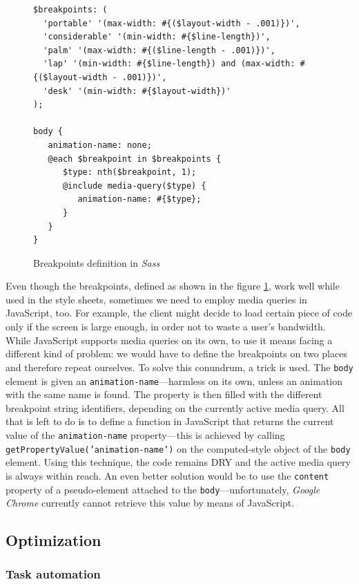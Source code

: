 \documentclass[thesis=M,english,hidelinks]{FITthesis}[2012/10/20]
\newcommand{\code}{\texttt}
\begin{document}
\begin{figure}[h]
  \begin{lstlisting}
$breakpoints: (
  'portable' '(max-width: #{($layout-width - .001)})',
  'considerable' '(min-width: #{$line-length})',
  'palm' '(max-width: #{($line-length - .001)})',
  'lap' '(min-width: #{$line-length}) and (max-width: #{($layout-width - .001)})',
  'desk' '(min-width: #{$layout-width})'
);

body {
   animation-name: none;
   @each $breakpoint in $breakpoints {
      $type: nth($breakpoint, 1);
      @include media-query($type) {
         animation-name: #{$type};
      }
   }
}
  \end{lstlisting}
  \caption{Breakpoints definition in \textit{Sass}}
  \label{fig:sass_breakpoints}
\end{figure}

Even though the breakpoints, defined as shown in the figure \ref{fig:sass_breakpoints}, work well while used in the style sheets, sometimes we need to employ media queries in JavaScript, too. For example, the client might decide to load certain piece of code only if the screen is large enough, in order not to waste a user's bandwidth. While JavaScript supports media queries on its own, to use it means facing a different kind of problem: we would have to define the breakpoints on two places and therefore repeat ourselves. To solve this conundrum, a trick is used. The \code{body} element is given an \code{animation-name}---harmless on its own, unless an animation with the same name is found. The property is then filled with the different breakpoint string identifiers, depending on the currently active media query. All that is left to do is to define a function in JavaScript that returns the current value of the \code{animation-name} property---this is achieved by calling \code{getPropertyValue('animation-name')} on the computed-style object of the \code{body} element. Using this technique, the code remains DRY and the active media query is always within reach. An even better solution would be to use the \code{content} property of a pseudo-element attached to the \code{body}---unfortunately, \textit{Google Chrome} currently cannot retrieve this value by means of JavaScript.

  \subsection{Optimization}

    \subsubsection{Task automation}
\end{document}
